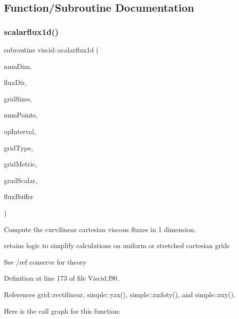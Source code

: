 \subsection{Function/\+Subroutine Documentation}
\hypertarget{namespaceviscid_aa6a01cbecb9c6bafc111dc0dd7411891}{}\label{namespaceviscid_aa6a01cbecb9c6bafc111dc0dd7411891} 
\subsubsection{\texorpdfstring{scalarflux1d()}{scalarflux1d()}}
{\footnotesize\ttfamily subroutine viscid\+::scalarflux1d (\begin{DoxyParamCaption}\item[{integer(kind=4), intent(in)}]{num\+Dim,  }\item[{integer(kind=4), intent(in)}]{flux\+Dir,  }\item[{integer(kind=8), dimension(numdim), intent(in)}]{grid\+Sizes,  }\item[{integer(kind=8), intent(in)}]{num\+Points,  }\item[{integer(kind=8), dimension(2$\ast$numdim), intent(in)}]{op\+Interval,  }\item[{integer(kind=4), intent(in)}]{grid\+Type,  }\item[{real(kind=8), dimension(numdim$\ast$numdim$\ast$numpoints), intent(in), target}]{grid\+Metric,  }\item[{real(kind=8), dimension(numpoints$\ast$numdim), intent(in), target}]{grad\+Scalar,  }\item[{real(kind=8), dimension(numpoints), intent(out)}]{flux\+Buffer }\end{DoxyParamCaption})}



Compute the curvilinear cartesian viscous fluxes in 1 dimension. 

retains logic to simplify calculations on uniform or stretched cartesian grids

See /ref conserve for theory 

Definition at line 173 of file Viscid.\+f90.



References grid\+::rectilinear, simple\+::yax(), simple\+::zxdoty(), and simple\+::zxy().

Here is the call graph for this function\+:
\hypertarget{namespaceviscid_aa370fc5ec33429588facc68ee01d8435}{}\label{namespaceviscid_aa370fc5ec33429588facc68ee01d8435} 
